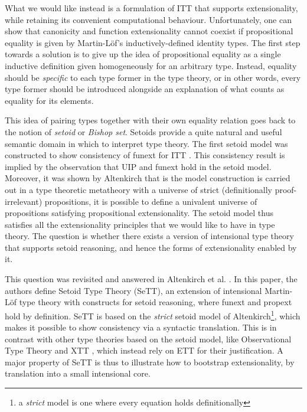 \documentclass{easychair}
\begin{document}
What we would like instead is a formulation of ITT that supports extensionality,
while retaining its convenient computational behaviour.
%
Unfortunately, one can show that canonicity and function extensionality cannot
coexist if propositional equality is given by Martin-L\"of's inductively-defined
identity types.
%
The first step towards a solution is to give up the idea of propositional
equality as a single inductive definition given homogeneously for an arbitrary
type. Instead, equality should be \emph{specific} to each type former in the
type theory, or in other words, every type former should be introduced alongside
an explanation of what counts as equality for its elements.

This idea of pairing types together with their own equality relation goes back
to the notion of \emph{setoid} or \emph{Bishop set}. Setoids provide a quite
natural and useful semantic domain in which to interpret type theory. The first
setoid model was constructed to show consistency of funext for ITT
\cite{hofmann}. This consistency result is implied by the observation that UIP
and funext hold in the setoid model. Moreover, it was shown by Altenkirch
\cite{setoid99} that is the model construction is carried out in a type
theoretic metatheory with a universe of strict (definitionally proof-irrelevant)
propositions, it is possible to define a univalent universe of propositions
satisfying propositional extensionality. The setoid model thus satisfies all the
extensionality principles that we would like to have in type theory. The
question is whether there exists a version of intensional type theory that
supports setoid reasoning, and hence the forms of extensionality enabled by it.

This question was revisited and answered in Altenkirch et al. \cite{mpc19}. In
this paper, the authors define Setoid Type Theory (SeTT), an extension of
intensional Martin-L\"of type theory with constructs for setoid reasoning, where
funext and propext hold by definition. SeTT is based on the \emph{strict} setoid
model of Altenkirch\footnote{a \emph{strict} model is one where every equation
  holds definitionally}, which makes it possible to show consistency via a
syntactic translation. This is in contrast with other type theories based on the
setoid model, like Observational Type Theory \cite{alti:ott-conf, alti:ott-conf}
and XTT \cite{xtt}, which instead rely on ETT for their justification. A major
property of SeTT is thus to illustrate how to bootstrap extensionality, by
translation into a small intensional core.
\end{document}

